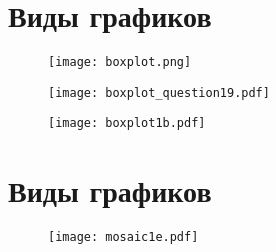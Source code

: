 \documentclass[xcolor=dvipsnames, 12pt]{beamer}
\begin{document}


\section{Виды графиков }

\begin{frame}

\begin{figure}[h!]
\hspace*{-0.9cm}
 \centering
 \texttt{[image: boxplot.png]}

\end{figure}

\end{frame}

\begin{frame}

\begin{figure}[h!]
\hspace*{-1cm}
 \centering
 \texttt{[image: boxplot\_question19.pdf]}

\end{figure}

\end{frame}

\begin{frame}

\begin{figure}[h!]
\hspace*{-1cm}
 \centering
 \texttt{[image: boxplot1b.pdf]}

\end{figure}

\end{frame}

\section{Виды графиков }

\begin{frame}

\begin{figure}[h!]
\hspace*{-1cm}
 \centering
 \texttt{[image: mosaic1e.pdf]}

\end{figure}

\end{frame}
\end{document}
